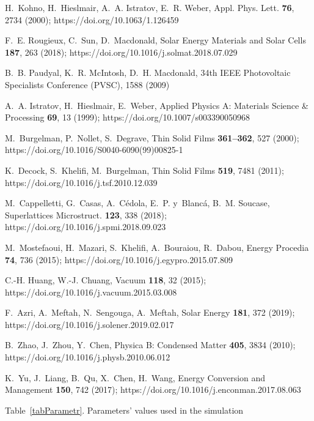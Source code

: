 ﻿\documentclass[12pt]{article}
\begin{document}
\begin{thebibliography}{99}
H.~Kohno, H.~Hieslmair, A.~A. Istratov, E.~R. Weber, Appl.
  Phys. Lett. \textbf{76}, 2734 (2000);
https://doi.org/10.1063/1.126459

F.~E. Rougieux, C.~Sun, D.~Macdonald,
Solar Energy Materials and Solar Cells \textbf{187}, 263 (2018);
https://doi.org/10.1016/j.solmat.2018.07.029

B.~B. {Paudyal}, K.~R. {McIntosh}, D.~H. {Macdonald},
  34th IEEE Photovoltaic Specialists Conference (PVSC), 1588 (2009)

A.~A. Istratov, H.~Hieslmair, E.~Weber,
  Applied Physics A: Materials Science \& Processing \textbf{69}, 13 (1999);
https://doi.org/10.1007/s003390050968

M.~Burgelman, P.~Nollet, S.~Degrave, Thin Solid Films \textbf{361--362}, 527 (2000);
https://doi.org/10.1016/S0040-6090(99)00825-1

K.~Decock, S.~Khelifi, M.~Burgelman, Thin Solid Films \textbf{519}, 7481 (2011);
https://doi.org/10.1016/j.tsf.2010.12.039

M.~Cappelletti, G.~Casas, A.~Cédola, E.~P. y~Blancá, B.~M. Soucase,
 Superlattices  Microstruct. \textbf{123}, 338 (2018);
https://doi.org/10.1016/j.spmi.2018.09.023

M.~Mostefaoui, H.~Mazari, S.~Khelifi, A.~Bouraiou, R.~Dabou,
 Energy Procedia \textbf{74}, 736  (2015);
https://doi.org/10.1016/j.egypro.2015.07.809

C.-H. Huang, W.-J. Chuang,
  Vacuum \textbf{118}, 32 (2015);
https://doi.org/10.1016/j.vacuum.2015.03.008

F.~Azri, A.~Meftah, N.~Sengouga, A.~Meftah,
Solar Energy \textbf{181}, 372 (2019);
https://doi.org/10.1016/j.solener.2019.02.017

B.~Zhao, J.~Zhou, Y.~Chen,
 Physica B: Condensed Matter \textbf{405}, 3834 (2010);
https://doi.org/10.1016/j.physb.2010.06.012

K.~Yu, J.~Liang, B.~Qu, X.~Chen, H.~Wang,
 Energy Conversion and Management \textbf{150}, 742 (2017);
https://doi.org/10.1016/j.enconman.2017.08.063

\end{thebibliography}


\newpage

Table~\ref{tabParametr}.
Parameters' values used in the simulation
\end{document}

